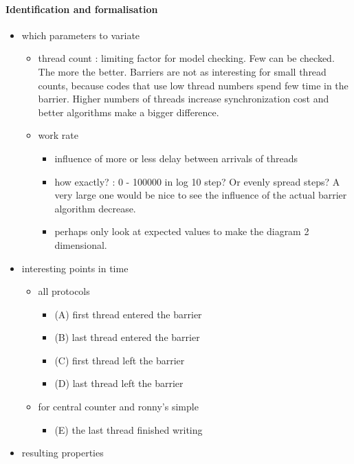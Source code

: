 \documentclass[a4paper, 10pt]{article}
\begin{document}
\begin{enumerate}
\paragraph{Identification and formalisation}
\label{ssssec:analysis-modelchecking-quantitative-properties-identification}
\begin{itemize}
	\item which parameters to variate
		\begin{itemize}
			\item thread count : limiting factor for model checking. Few can be checked. The more the better. Barriers are not as interesting for small thread counts, because codes that use low thread numbers spend few time in the barrier. Higher numbers of threads increase synchronization cost and better algorithms make a bigger difference.
			\item work rate
				\begin{itemize}
					\item influence of more or less delay between arrivals of threads
					\item how exactly? : 0 - 100000 in log 10 step? Or evenly spread steps? A very large one would be nice to see the influence of the actual barrier algorithm decrease.
					\item perhaps only look at expected values to make the diagram 2 dimensional.
				\end{itemize}
		\end{itemize}
	\item interesting points in time
		\begin{itemize}
			\item all protocols
				\begin{itemize}
					\item (A) first thread entered the barrier
					\item (B) last thread entered the barrier
					\item (C) first thread left the barrier
					\item (D) last thread left the barrier
				\end{itemize}
			\item for central counter and ronny's simple
				\begin{itemize}
					\item (E) the last thread finished writing
				\end{itemize}
		\end{itemize}
	\item resulting properties

\end{itemize}
\end{enumerate}
\end{document}
